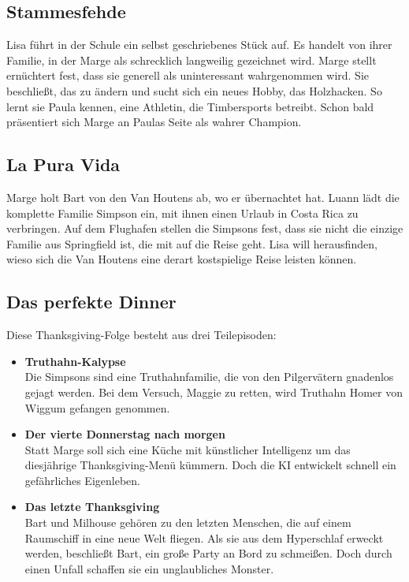 \subsection{Stammesfehde}
Lisa führt in der Schule ein selbst geschriebenes Stück auf. Es handelt von ihrer Familie, in der Marge als schrecklich langweilig gezeichnet wird. Marge stellt ernüchtert fest, dass sie generell als uninteressant wahrgenommen wird. Sie beschließt, das zu ändern und sucht sich ein neues Hobby, das Holzhacken. So lernt sie Paula kennen, eine Athletin, die Timbersports betreibt. Schon bald präsentiert sich Marge an Paulas Seite als wahrer Champion.


\subsection{La Pura Vida}\label{ZABF03}
Marge holt Bart von den Van Houtens ab, wo er übernachtet hat. Luann lädt die komplette Familie Simpson ein, mit ihnen einen Urlaub in Costa Rica zu verbringen. Auf dem Flughafen stellen die Simpsons fest, dass sie nicht die einzige Familie aus Springfield ist, die mit auf die Reise geht. Lisa will herausfinden, wieso sich die Van Houtens eine derart kostspielige Reise leisten können.


\subsection{Das perfekte Dinner}\label{YABF17}
Diese Thanksgiving-Folge besteht aus drei Teilepisoden:
\begin{itemize}
  \item \textbf{Truthahn-Kalypse}\\ Die Simpsons sind eine Truthahnfamilie, die von den Pilgervätern gnadenlos gejagt werden. Bei dem Versuch, Maggie zu retten, wird Truthahn Homer von Wiggum gefangen genommen.
  \item \textbf{Der vierte Donnerstag nach morgen}\\ Statt Marge soll sich eine Küche mit künstlicher Intelligenz um das diesjährige Thanksgiv\-ing-Menü kümmern. Doch die KI entwickelt schnell ein gefährliches Eigenleben.
  \item  \textbf{Das letzte Thanksgiving}\\ Bart und Milhouse gehören zu den letzten Menschen, die auf einem Raumschiff in eine neue Welt fliegen. Als sie aus dem Hyperschlaf erweckt werden, beschließt Bart, ein große Party an Bord zu schmeißen. Doch durch einen Unfall schaffen sie ein unglaubliches Monster.
\end{itemize}

